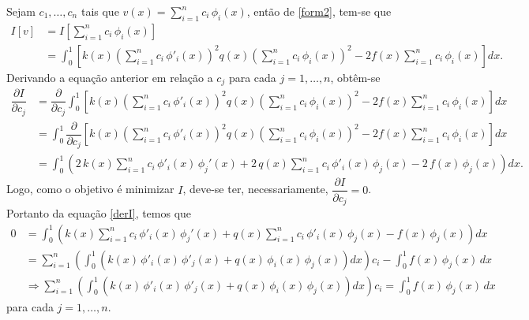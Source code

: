 \documentclass[12pt,a4paper]{report}
\newcommand{\dis}{\displaystyle}
\newcommand{\pa}{\partial}
\begin{document}
Sejam $c_1,\dots,c_n$ tais que $v(x)=\dis\sum_{i=1}^nc_i\,\phi_i(x)$, então de \eqref{form2}, tem-se que
\begin{equation}
\begin{aligned}
I[v] &= I\left[\dis\sum_{i=1}^nc_i\,\phi_i(x) \right]\\
&= \dis\int_0^1\left[k(x)\left(\dis\sum_{i=1}^nc_i\,\phi'_i(x)\right)^2q(x)\left(\dis\sum_{i=1}^nc_i\,\phi_i(x)\right)^2-2f(x)\dis\sum_{i=1}^nc_i\,\phi_i(x)\right]dx.
\end{aligned}
\end{equation}  
Derivando a equação anterior em relação a $c_j$ para cada $j=1,\dots,n$, obtêm-se
\begin{equation}\label{derI}
\begin{aligned}
\dfrac{\pa I}{\pa c_j} &= \dfrac{\pa }{\pa c_j}\dis\int_0^1\left[k(x)\left(\dis\sum_{i=1}^nc_i\,\phi'_i(x)\right)^2q(x)\left(\dis\sum_{i=1}^nc_i\,\phi_i(x)\right)^2-2f(x)\dis\sum_{i=1}^nc_i\,\phi_i(x)\right]dx\\
&= \dis\int_0^1\dfrac{\pa}{\pa c_j}\left[k(x)\left(\dis\sum_{i=1}^nc_i\,\phi'_i(x)\right)^2q(x)\left(\dis\sum_{i=1}^nc_i\,\phi_i(x)\right)^2-2f(x)\dis\sum_{i=1}^nc_i\,\phi_i(x)\right]dx\\
&= \dis\int_0^1\left(2\,k(x)\dis\sum_{i=1}^nc_i\,\phi'_i(x)\,\phi_j'(x) + 2\,q(x)\dis\sum_{i=1}^nc_i\,\phi'_i(x)\,\phi_j(x) - 2\,f(x)\,\phi_j(x)\right)dx.
\end{aligned}
\end{equation}
Logo, como o objetivo é minimizar $I$, deve-se  ter, necessariamente, $\dfrac{\pa I}{\pa c_j}=0$. Portanto da equação \eqref{derI}, temos que 
\begin{equation}\label{sist}
\begin{aligned}
0 &= \dis\int_0^1\left(k(x)\dis\sum_{i=1}^nc_i\,\phi'_i(x)\,\phi_j'(x) + q(x)\dis\sum_{i=1}^nc_i\,\phi'_i(x)\,\phi_j(x) - f(x)\,\phi_j(x)\right)dx\\
&= \dis\sum_{i=1}^n\left(\dis\int_0^1 (k(x)\,\phi'_i(x)\,\phi'_j(x) + q(x)\,\phi_i(x)\,\phi_j(x))dx\right)c_i - \dis\int_0^1f(x)\,\phi_j(x)\,dx\\
&\Longrightarrow \dis\sum_{i=1}^n\left(\dis\int_0^1 (k(x)\,\phi'_i(x)\,\phi'_j(x) + q(x)\,\phi_i(x)\,\phi_j(x))dx\right)c_i = \dis\int_0^1f(x)\,\phi_j(x)\,dx
\end{aligned}
\end{equation}
para cada $j=1,\dots,n$.\\
\end{document}
